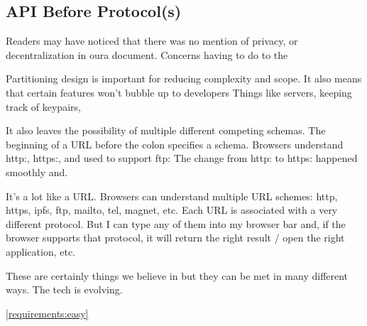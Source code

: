 
\subsection{API Before Protocol(s)}

Readers may have noticed that there was no mention of privacy,
or decentralization in oura document.
Concerns having to do to the

Partitioning design is important for reducing complexity and scope.
It also means that certain features won't bubble up to developers
Things like servers, keeping track of keypairs,

It also leaves the possibility of multiple different competing
schemas. The beginning of a URL before the colon specifies a schema.
Browsers understand http:, https:, and used to support ftp:
The change from http: to https: happened smoothly and.

It's a lot like a URL. Browsers can understand multiple URL schemes: http, https, ipfs, ftp, mailto, tel, magnet, etc. Each URL is associated with a very different protocol. But I can type any of them into my browser bar and, if the browser supports that protocol, it will return the right result / open the right application, etc.

These are certainly things we believe in but they can be met in many different ways.
The tech is evolving.

\ref{requirements:easy}
